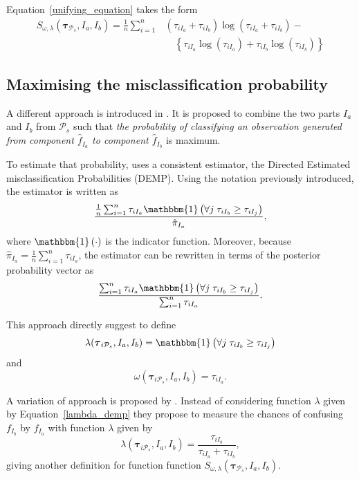 \documentclass[10pt, a4paper]{article}
\newcommand{\m}[1]{\boldsymbol{#1}}
\begin{document}
\begin{spacing}{1.9}
Equation~\ref{unifying_equation} takes the form
\[
\begin{split}
S_{\omega, \lambda}( \m\tau_{\mathcal{P}_s},  I_a,  I_b) = \frac{1}{n} \sum_{i=1}^n & (\tau_{iI_a}+\tau_{iI_b}) \log(\tau_{iI_a} + \tau_{iI_b}) - \\ 
&\quad \left\{ \tau_{iI_a} \log(\tau_{iI_a}) + \tau_{iI_b} \log(\tau_{iI_b}) \right\}
\end{split}
\]


\subsection{Maximising the misclassification probability}
\label{missclassification_section}

A different approach is introduced in \citep{hennig2010methods}. It is proposed to combine the two parts $I_a$ and $I_b$ from $ \mathcal{P}_s$ such that \emph{the probability of classifying an observation generated from component $\hat{f}_{I_a}$ to component $\hat{f}_{I_b}$} is maximum.

To estimate that probability,  \cite{hennig2010methods} uses a consistent estimator, the Directed Estimated misclassification Probabilities (DEMP). Using the notation previously introduced, the estimator is written as
\[
\frac{ \frac{1}{n} \sum_{i=1}^n {\tau_{iI_a} \mathbbm{1}\left( \forall j\; \tau_{i I_{b}} \geq \tau_{iI_j} \right)}}{ \hat{\pi}_{I_a}},
\]
where $\mathbbm{1}\left( \cdot \right)$ is the indicator function. Moreover, because $ \hat{\pi}_{I_a} = \frac{1}{n} \sum_{i=1}^n \tau_{iI_a}$, the estimator can be rewritten in terms of the posterior probability vector as
\begin{equation}\label{demp_criteria}
\frac{ \sum_{i=1}^n {\tau_{iI_a} \mathbbm{1}\left( \forall j\; \tau_{i I_{b}} \geq \tau_{iI_j} \right)}}{\sum_{i=1}^n \tau_{iI_a} }.
\end{equation}

This approach directly suggest to define
\begin{equation}\label{lambda_demp}
\lambda(\m\tau_{i \mathcal{P}_s},  I_a,  I_b) = \mathbbm{1}\left( \forall j\; \tau_{i I_{b}} \geq \tau_{iI_j} \right)
\end{equation}
and
\[
\omega(\m\tau_{i \mathcal{P}_s},  I_a,  I_b) =  \tau_{iI_a}.
\]

A variation of \cite{hennig2010methods} approach is proposed by \cite{longford2014}. Instead of considering function $\lambda$ given by Equation~\ref{lambda_demp} they propose to measure the chances of confusing $f_{I_b}$ by $f_{I_a}$ with function $\lambda$ given by
\[
\lambda(\m\tau_{i \mathcal{P}_s},  I_a,  I_b) = \frac{\tau_{iI_b}}{\tau_{iI_a} + \tau_{iI_b}},
\]
giving another definition for function function $S_{\omega, \lambda}( \m\tau_{\mathcal{P}_s},  I_a,  I_b)$.



\end{spacing}
\end{document}
